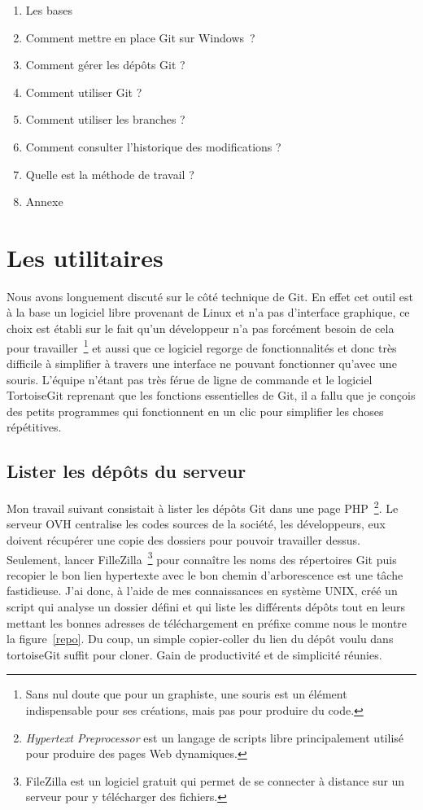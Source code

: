 \begin{enumerate}
    \item Les bases
    \item Comment mettre en place Git sur Windows~\textregistered ?
    \item Comment gérer les dépôts Git ?
    \item Comment utiliser Git ?
    \item Comment utiliser les branches ?
    \item Comment consulter l'historique des modifications ?
    \item Quelle est la méthode de travail ?
    \item Annexe
\end{enumerate}

\section{Les utilitaires} %
\label{sec:Les utilitaires}

Nous avons longuement discuté sur le côté technique de Git. En effet cet
outil est à la base un logiciel libre provenant de Linux et n'a pas
d'interface graphique, ce choix est établi sur le fait qu'un développeur
n'a pas forcément besoin de cela pour travailler\, \footnote{Sans nul
doute que pour un graphiste, une souris est un élément indispensable
pour ses créations, mais pas pour produire du code.} et aussi que ce
logiciel regorge de fonctionnalités et donc très difficile à simplifier
à travers une interface ne pouvant fonctionner qu'avec une souris.
L'équipe n'étant pas très férue de ligne de commande et le logiciel
TortoiseGit reprenant que les fonctions essentielles de Git, il a fallu
que je conçois des petits programmes qui fonctionnent en un clic pour
simplifier les choses répétitives.

\subsection{Lister les dépôts du serveur} %
\label{sub:Lister les dépôts du serveur}

Mon travail suivant consistait à lister les dépôts Git dans une page
PHP\, \footnote{\emph{Hypertext Preprocessor} est un langage de scripts
libre principalement utilisé pour produire des pages Web dynamiques.}.
Le serveur OVH centralise les codes sources de la société, les
développeurs, eux doivent récupérer une copie des dossiers pour pouvoir
travailler dessus. Seulement, lancer FilleZilla\, \footnote{FileZilla
est un logiciel gratuit qui permet de se connecter à distance sur un
serveur pour y télécharger des fichiers.} pour connaître les noms des
répertoires Git puis recopier le bon lien hypertexte avec le bon chemin
d'arborescence est une tâche fastidieuse.  J'ai donc, à l'aide de mes
connaissances en système UNIX, créé un script qui analyse un dossier
défini et qui liste les différents dépôts tout en leurs mettant les
bonnes adresses de téléchargement en préfixe comme nous le montre la
figure~\ref{repo}. Du coup, un simple copier-coller du lien du dépôt
voulu dans tortoiseGit suffit pour cloner. Gain de productivité et de
simplicité réunies.

